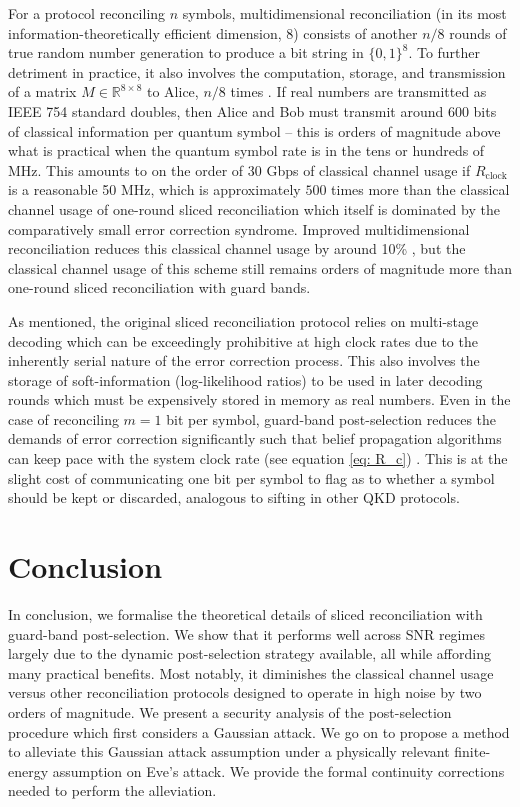 ﻿\documentclass[12pt]{article}
\begin{document}
For a protocol reconciling $n$ symbols, multidimensional reconciliation (in its most information-theoretically efficient dimension, 8) consists of another $n/8$ rounds of true random number generation to produce a bit string in $\{0, 1\}^8$. To further detriment in practice, it also involves the computation, storage, and transmission of a matrix $M \in \mathbb{R}^{8 \times 8}$ to Alice, $n / 8$ times \cite{Leverrier-2008}. If real numbers are transmitted as IEEE 754 standard doubles, then Alice and Bob must transmit around 600 bits of classical information per quantum symbol -- this is orders of magnitude above what is practical when the quantum symbol rate is in the tens or hundreds of MHz. This amounts to on the order of 30 Gbps of classical channel usage if $R_\text{clock}$ is a reasonable 50 MHz, which is approximately $500$ times more than the classical channel usage of one-round sliced reconciliation which itself is dominated by the comparatively small error correction syndrome. Improved multidimensional reconciliation reduces this classical channel usage by around 10\% \cite{Li-2019}, but the classical channel usage of this scheme still remains orders of magnitude more than one-round sliced reconciliation with guard bands.

As mentioned, the original sliced reconciliation protocol relies on multi-stage decoding which can be exceedingly prohibitive at high clock rates due to the inherently serial nature of the error correction process. This also involves the storage of soft-information (log-likelihood ratios) to be used in later decoding rounds which must be expensively stored in memory as real numbers. Even in the case of reconciling $m=1$ bit per symbol, guard-band post-selection reduces the demands of error correction significantly such that belief propagation algorithms can keep pace with the system clock rate (see equation \eqref{eq: R_c}) \cite{Weerasinghe-2023}. This is at the slight cost of communicating one bit per symbol to flag as to whether a symbol should be kept or discarded, analogous to sifting in other QKD protocols.

\section{Conclusion}

In conclusion, we formalise the theoretical details of sliced reconciliation with guard-band post-selection. We show that it performs well across SNR regimes largely due to the dynamic post-selection strategy available, all while affording many practical benefits. Most notably, it diminishes the classical channel usage versus other reconciliation protocols designed to operate in high noise by two orders of magnitude. We present a security analysis of the post-selection procedure which first considers a Gaussian attack. We go on to propose a method to alleviate this Gaussian attack assumption under a physically relevant finite-energy assumption on Eve's attack. We provide the formal continuity corrections needed to perform the alleviation.
\end{document}
